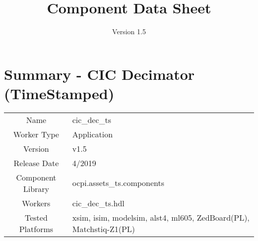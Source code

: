 \iffalse
This file is protected by Copyright. Please refer to the COPYRIGHT file
distributed with this source distribution.

This file is part of OpenCPI <http://www.opencpi.org>

OpenCPI is free software: you can redistribute it and/or modify it under the
terms of the GNU Lesser General Public License as published by the Free Software
Foundation, either version 3 of the License, or (at your option) any later
version.

OpenCPI is distributed in the hope that it will be useful, but WITHOUT ANY
WARRANTY; without even the implied warranty of MERCHANTABILITY or FITNESS FOR A
PARTICULAR PURPOSE. See the GNU Lesser General Public License for more details.

You should have received a copy of the GNU Lesser General Public License along
with this program. If not, see <http://www.gnu.org/licenses/>.
\fi
\def\importpath{../../../imports/ocpi.assets/components/dsp_comps/cic_dec.test/doc/}

\def\docTitle{Component Data Sheet}
\def\docVersion{1.5}
\date{Version \docVersion} %
\title{\docTitle}
\lhead{\small{\docTitle}}

\def\comp{cic\_dec\_ts}
\edef\ecomp{cic_dec_ts}
\def\Comp{CIC Decimator (TimeStamped)}
\graphicspath{ {figures/} }



\section*{Summary - \Comp}
\begin{tabular}{|c|M{13.5cm}|}
	\hline
	                  &                                                    \\
	\hline
	Name              & \comp                                              \\
	\hline
	Worker Type       & Application                                        \\
	\hline
	Version           & v\docVersion \\
	\hline
	Release Date      & 4/2019 \\
	\hline
	Component Library & ocpi.assets\_ts.components \\
	\hline
	Workers           & \comp.hdl                                          \\
	\hline
	Tested Platforms  & xsim, isim, modelsim, alst4, ml605, ZedBoard(PL), Matchstiq-Z1(PL) \\
	\hline
\end{tabular}

